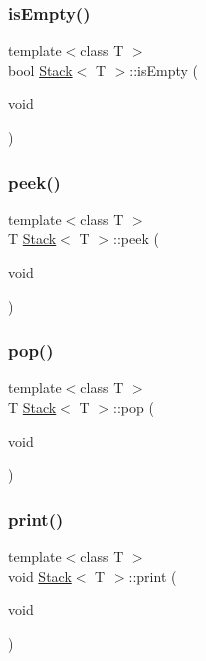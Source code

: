 \subsubsection{\texorpdfstring{is\+Empty()}{isEmpty()}}
{\footnotesize\ttfamily template$<$class T $>$ \\
bool \hyperlink{class_stack}{Stack}$<$ T $>$\+::is\+Empty (\begin{DoxyParamCaption}\item[{void}]{ }\end{DoxyParamCaption})}

\mbox{\label{class_stack_ad7412fe27cde6dd3013a67ea52b69022}} 
\subsubsection{\texorpdfstring{peek()}{peek()}}
{\footnotesize\ttfamily template$<$class T $>$ \\
T \hyperlink{class_stack}{Stack}$<$ T $>$\+::peek (\begin{DoxyParamCaption}\item[{void}]{ }\end{DoxyParamCaption})}

\mbox{\label{class_stack_a8d8f56937bf9f1af92ee19ae897bae29}} 
\subsubsection{\texorpdfstring{pop()}{pop()}}
{\footnotesize\ttfamily template$<$class T $>$ \\
T \hyperlink{class_stack}{Stack}$<$ T $>$\+::pop (\begin{DoxyParamCaption}\item[{void}]{ }\end{DoxyParamCaption})}

\mbox{\label{class_stack_a8652de3a4bd4d24976ec3747d7237ed2}} 
\subsubsection{\texorpdfstring{print()}{print()}}
{\footnotesize\ttfamily template$<$class T $>$ \\
void \hyperlink{class_stack}{Stack}$<$ T $>$\+::print (\begin{DoxyParamCaption}\item[{void}]{ }\end{DoxyParamCaption})}

